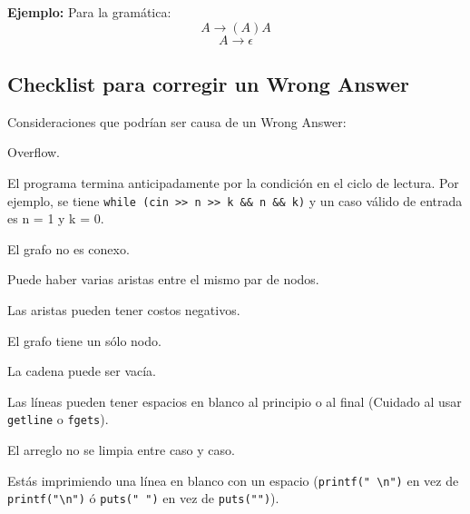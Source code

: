 \documentclass[10pt,letterpaper,twocolumn]{article}
\newcommand{\codigofuente}[1]{

\dotfill
}
\begin{document}
\medskip
\textbf{Ejemplo:} Para la gramática:
$$
A \longrightarrow (A)A
$$ $$
A \longrightarrow \epsilon
$$

\codigofuente{./src/misc/parser_recursivo_desc.cpp}

\subsection{Checklist para corregir un Wrong Answer}
Consideraciones que podrían ser causa de un Wrong Answer:
\begin{itemize}
  \begin{item}
    Overflow.
  \end{item}

  \begin{item}
    El programa termina anticipadamente por la condición en el ciclo de lectura.
    Por ejemplo, se tiene \verb_while (cin >> n >> k && n && k)_ y un caso válido de entrada
    es n = 1 y k = 0.
  \end{item}

  \begin{item}
    El grafo no es conexo.
  \end{item}

  \begin{item}
    Puede haber varias aristas entre el mismo par de nodos.
  \end{item}

  \begin{item}
    Las aristas pueden tener costos negativos.
  \end{item}

  \begin{item}
    El grafo tiene un sólo nodo.
  \end{item}

  \begin{item}
    La cadena puede ser vacía.
  \end{item}

  \begin{item}
    Las líneas pueden tener espacios en blanco al principio o al final (Cuidado al usar \texttt{getline} o \texttt{fgets}).
  \end{item}

  \begin{item}
    El arreglo no se limpia entre caso y caso.
  \end{item}

  \begin{item}
    Estás imprimiendo una línea en blanco con un espacio (\verb_printf(" \n")_ en vez de \verb_printf("\n")_  ó \verb_puts(" ")_  en vez de \verb_puts("")_).
  \end{item}


\end{itemize}
\end{document}
